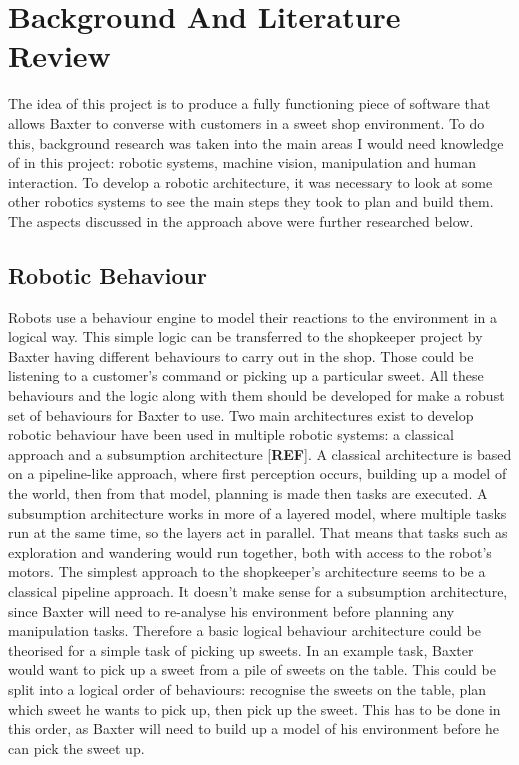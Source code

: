 \chapter{Background And Literature Review}
\label{chapter2}
The idea of this project is to produce a fully functioning piece of software that allows Baxter to converse with customers in a sweet shop environment. To do this, background research was taken into the main areas I would need knowledge of in this project: robotic systems, machine vision, manipulation and human interaction. To develop a robotic architecture, it was necessary to look at some other robotics systems to see the main steps they took to plan and build them. The aspects discussed in the approach above were further researched below.
\section{Robotic Behaviour}
Robots use a behaviour engine to model their reactions to the environment in a logical way. This simple logic can be transferred to the shopkeeper project by Baxter having different behaviours to carry out in the shop. Those could be listening to a customer's command or picking up a particular sweet. All these behaviours and the logic along with them should be developed for make a robust set of behaviours for Baxter to use.
\newline\newline
Two main architectures exist to develop robotic behaviour have been used in multiple robotic systems: a classical approach and a subsumption architecture [\textbf{REF}]. A classical architecture is based on a pipeline-like approach, where first perception occurs, building up a model of the world, then from that model, planning is made then tasks are executed. A subsumption architecture works in more of a layered model, where multiple tasks run at the same time, so the layers act in parallel. That means that tasks such as exploration and wandering would run together, both with access to the robot's motors.
\newline\newline
The simplest approach to the shopkeeper's architecture seems to be a classical pipeline approach. It doesn't make sense for a subsumption architecture, since Baxter will need to re-analyse his environment before planning any manipulation tasks. Therefore a basic logical behaviour architecture could be theorised for a simple task of picking up sweets. In an example task, Baxter would want to pick up a sweet from a pile of sweets on the table. This could be split into a logical order of behaviours: recognise the sweets on the table, plan which sweet he wants to pick up, then pick up the sweet. This has to be done in this order, as Baxter will need to build up a model of his environment before he can pick the sweet up.
